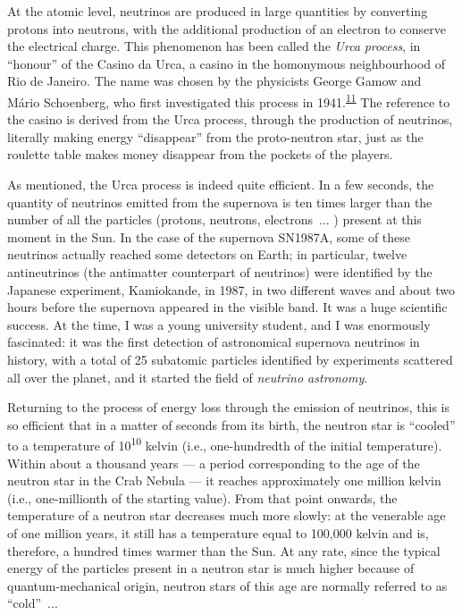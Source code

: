 At the atomic level, neutrinos are produced in large quantities by converting protons
into neutrons, with the additional production of an electron to
conserve the electrical charge. This phenomenon has been called the
\emph{Urca} \emph{process}, in ``honour'' of the Casino da
Urca, a casino in the homonymous neighbourhood of Rio de Janeiro. The
name was chosen by the physicists George Gamow and Mário
Schoenberg, who first investigated this process in
1941.\textsuperscript{\hyperlink{note:05-11}{11}} The reference to the casino is derived from the Urca process,
through the production of neutrinos, literally making energy ``disappear'' from the
proto-neutron star, just as the roulette table makes money disappear from the pockets of
the players.

As mentioned, the Urca process is indeed quite efficient. In a few seconds, the quantity
of neutrinos emitted from the supernova is ten times larger than the number of all the
particles (protons, neutrons, electrons~... ) present at this moment in the Sun. In the
case of the supernova SN1987A, some of these
neutrinos actually reached some detectors on Earth; in particular, twelve antineutrinos
(the antimatter counterpart of neutrinos) were identified by the Japanese experiment,
Kamiokande, in 1987, in two different waves and about two hours
before the supernova appeared in the visible band. It was a huge scientific success. At
the time, I was a young university student, and I was enormously fascinated: it was the
first detection of astronomical supernova neutrinos in history, with a total of 25
subatomic particles identified by experiments scattered all over the planet, and it
started the field of \emph{neutrino astronomy}. 

Returning to the process of energy loss through the emission of neutrinos, this is so
efficient that in a matter of seconds from its birth, the neutron star is ``cooled'' to
a temperature of 10\textsuperscript{10} kelvin (i.e., one-hundredth of the initial
temperature). Within about a thousand years --- a period corresponding to the age of the
neutron star in the Crab Nebula
--- it reaches approximately one million kelvin (i.e., one-millionth of the starting
value). From that point onwards, the temperature of a neutron star decreases much more
slowly: at the venerable age of one million years, it still has a temperature equal to
100,000 kelvin and is, therefore, a hundred times warmer than the Sun. At any rate,
since the typical energy of the particles present in a neutron star is much higher
because of quantum-mechanical origin, neutron stars of this age are normally referred to
as ``cold''~...


